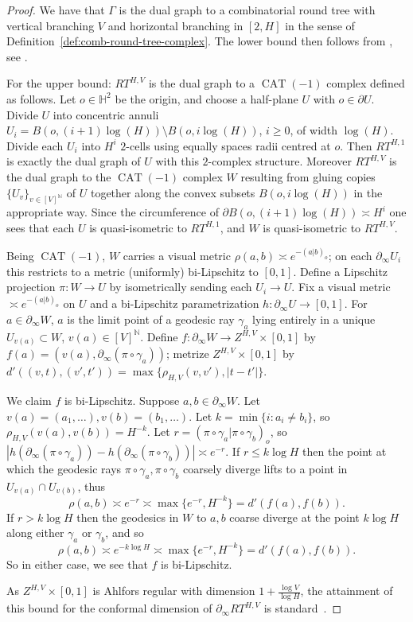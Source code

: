 \documentclass[11pt]{amsart}
\numberwithin{equation}{section}
\theoremstyle{citing}
\DeclareMathOperator{\CAT}{CAT}
\newcommand{\bdry}{\partial_\infty}
\newcommand{\N}{\mathbb{N}}
\newcommand{\HH}{\mathbb{H}}
\numberwithin{equation}{section}
\begin{document}
\begin{proof}
	We have that $\Gamma$ is the dual graph to a combinatorial round tree with vertical branching $V$ and horizontal branching in $[2,H]$ in the sense of Definition~\ref{def:comb-round-tree-complex}.  The lower bound then follows from \cite[\S 6]{Mac-12-random-cdim}, see \cite[Theorem 7.2]{Mac-16-confdim-subcplxs}.

	For the upper bound: $RT^{H,V}$ is the dual graph to a $\CAT(-1)$ complex defined as follows.  Let $o \in \HH^2$ be the origin, and choose a half-plane $U$ with $o \in \partial U$.  Divide $U$ into concentric annuli $U_i = B(o,(i+1)\log(H))\setminus B(o,i\log(H))$, $i \geq 0$, of width $\log(H)$.
	Divide each $U_i$ into $H^i$ $2$-cells using equally spaces radii centred at $o$.  Then $RT^{H,1}$ is exactly the dual graph of $U$ with this $2$-complex structure.  Moreover $RT^{H,V}$ is the dual graph to the $\CAT(-1)$ complex $W$ resulting from gluing copies $\{U_v\}_{v \in [V]^\N}$ of $U$ together along the convex subsets $B(o,i\log(H))$ in the appropriate way.  Since the circumference of $\partial B(o,(i+1)\log(H)) \asymp H^i$ one sees that each $U$ is quasi-isometric to $RT^{H,1}$, and $W$ is quasi-isometric to $RT^{H,V}$.

	Being $\CAT(-1)$, $W$ carries a visual metric $\rho(a,b) \asymp e^{-(a|b)_o}$; on each $\bdry U_i$ this restricts to a metric (uniformly) bi-Lipschitz to $[0,1]$.
	Define a Lipschitz projection $\pi:W \to U$ by isometrically sending each $U_i \to U$.  Fix a visual metric $\asymp e^{-(a|b)_o}$ on $U$ and a bi-Lipschitz parametrization $h:\bdry U \to [0,1]$.
	For $a \in \bdry W$, $a$ is the limit point of a geodesic ray $\gamma_a$ lying entirely in a unique $U_{v(a)} \subset W$, $v(a)\in[V]^\N$.
	Define $f: \bdry W \to Z^{H,V} \times [0,1]$ by $f(a)=(v(a), \bdry (\pi \circ \gamma_a))$; metrize $Z^{H,V}\times[0,1]$ by $d'((v,t),(v',t')) = \max\{\rho_{H,V}(v,v'),|t-t'|\}$.
	
	We claim $f$ is bi-Lipschitz.
	Suppose $a, b \in \bdry W$.  
	Let $v(a)=(a_1,\ldots), v(b)=(b_1,\ldots)$.
	Let $k = \min \{ i : a_i \neq b_i\}$, so $\rho_{H,V}(v(a),v(b)) = H^{-k}$.
	Let $r = (\pi\circ \gamma_a | \pi\circ \gamma_b)_o$, so $|h(\bdry(\pi\circ\gamma_a))-h(\bdry(\pi\circ\gamma_b))| \asymp e^{-r}$.
	If $r \leq k \log H$ then the point at which the geodesic rays $\pi\circ \gamma_a, \pi\circ\gamma_b$ coarsely diverge lifts to a point in $U_{v(a)}\cap U_{v(b)}$, thus
	\[
		\rho(a,b) \asymp e^{-r} \asymp \max\{e^{-r},H^{-k}\} = d'(f(a),f(b)).
	\]
	If $r > k \log H$ then the geodesics in $W$ to $a,b$ coarse diverge at the point $k \log H$ along either $\gamma_a$ or $\gamma_b$, and so
	\[
		\rho(a,b) \asymp e^{-k\log H} \asymp \max\{e^{-r},H^{-k}\} = d'(f(a),f(b)).
	\]
	So in either case, we see that $f$ is bi-Lipschitz.

	As $Z^{H,V}\times [0,1]$ is Ahlfors regular with dimension $1+\frac{\log V}{\log H}$, the attainment of this bound for the conformal dimension of $\bdry RT^{H,V}$ is standard~\cite[Example 4.1.9]{Mac-Tys-cdimexpo}.
\end{proof}
\end{document}
